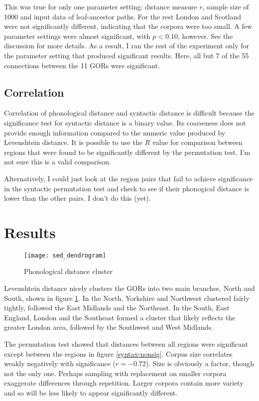 \documentclass[11pt]{article}
\begin{document}
This was true for only one parameter setting: distance measure $r$,
sample size of 1000 and input data of leaf-ancestor paths. For the
rest London and Scotland were not significantly different, indicating
that the corpora were too small. A few parameter settings were almost
significant, with $p < 0.10$, however. See the discussion for more details.
As a result, I ran the rest of the experiment only for the parameter
setting that produced significant results. Here, all but 7 of the 55
connections between the 11 GORs were significant.

\subsection{Correlation}
Correlation of phonological distance and syntactic distance is
difficult because the significance test for syntactic distance is a
binary value. Its coarseness does not provide enough information
compared to the numeric value produced by Levenshtein distance.
It is possible to use the $R$ value for comparison between regions
that were found to be significantly different by the permutation
test. I'm not sure this is a valid comparison.

Alternatively, I could just look at the region pairs that fail to
achieve significance in the syntactic permutation test and check to
see if their phonogical distance is lower than the other pairs. I
don't do this (yet).

\section{Results}

\begin{figure}
  \texttt{[image: sed\_dendrogram]}
\caption{Phonological distance cluster}
\label{phonology-dendrogram}
\end{figure}

Levenshtein distance nicely clusters the GORs into two main branches,
North and South, shown in figure \ref{phonology-dendrogram}. In the
North, Yorkshire and Northwest clustered fairly tightly, followed the
East Midlands and the Northeast. In the South, East England, London
and the Southeast formed a cluster that likely reflects the greater
London area, followed by the Southwest and West Midlands.

The permutation test showed that distances between all regions were
significant except between the regions in figure
\ref{syntax-nonsig}. Corpus size correlates weakly negatively with
significance ($r = -0.72$). Size is obviously a factor, though not the
only one. Perhaps sampling with replacement on smaller corpora
exaggerate differences through repetition. Larger corpora contain more
variety and so will be less likely to appear significantly different.
\end{document}
